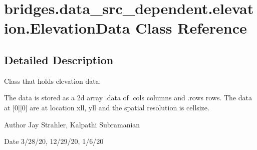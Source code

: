 \hypertarget{classbridges_1_1data__src__dependent_1_1elevation_1_1_elevation_data}{}\section{bridges.\+data\+\_\+src\+\_\+dependent.\+elevation.\+Elevation\+Data Class Reference}
\label{classbridges_1_1data__src__dependent_1_1elevation_1_1_elevation_data}


\subsection{Detailed Description}
Class that holds elevation data. 

The data is stored as a 2d array .data of .cols columns and .rows rows. The data at \mbox{[}0\mbox{]}\mbox{[}0\mbox{]} are at location xll, yll and the spatial resolution is cellsize.

\begin{DoxyAuthor}{Author}
Jay Strahler, Kalpathi Subramanian
\end{DoxyAuthor}
\begin{DoxyDate}{Date}
3/28/20, 12/29/20, 1/6/20 
\end{DoxyDate}
